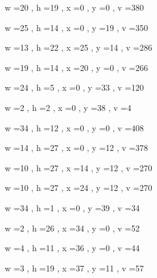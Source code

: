 \documentclass[11pt]{article}
\begin{document}
w =20 , h =19 , x =0 , y =0 , v =380
\par
w =25 , h =14 , x =0 , y =19 , v =350
\par
w =13 , h =22 , x =25 , y =14 , v =286
\par
w =19 , h =14 , x =20 , y =0 , v =266
\par
w =24 , h =5 , x =0 , y =33 , v =120
\par
w =2 , h =2 , x =0 , y =38 , v =4
\par
\newpage




w =34 , h =12 , x =0 , y =0 , v =408
\par
w =14 , h =27 , x =0 , y =12 , v =378
\par
w =10 , h =27 , x =14 , y =12 , v =270
\par
w =10 , h =27 , x =24 , y =12 , v =270
\par
w =34 , h =1 , x =0 , y =39 , v =34
\par
w =2 , h =26 , x =34 , y =0 , v =52
\par
w =4 , h =11 , x =36 , y =0 , v =44
\par
w =3 , h =19 , x =37 , y =11 , v =57
\par
\newpage
\end{document}

